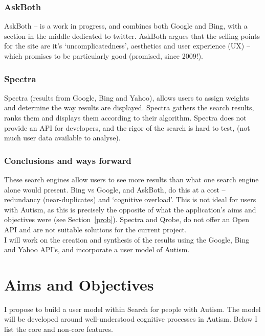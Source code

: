 \documentclass[a4paper, 10pt]{article}
\begin{document}
\subsubsection{AskBoth}
AskBoth – is a work in progress, and combines both Google and Bing, with a section in the middle dedicated to twitter. AskBoth argues that the selling points for the site are it’s ‘uncomplicatedness’, aesthetics and user experience (UX) – which promises to be particularly good (promised, since 2009!).

\subsubsection{Spectra}
Spectra (results from Google, Bing and Yahoo), allows users to assign weights and determine the way results are displayed. Spectra gathers the search results, ranks them and displays them according to their algorithm. Spectra does not provide an API for developers, and the rigor of the search is hard to test, (not much user data available to analyse).

\subsubsection{Conclusions and ways forward}
These search engines allow users to see more results than what one search engine alone would present. Bing vs Google, and AskBoth, do this at a cost -- redundancy (near-duplicates) and ‘cognitive overload’. This is not ideal for users with Autism, as this is precisely the opposite of what the application's aims and objectives were (see Section~\ref{prob}). Spectra and Qrobe, do not offer an Open API and are not suitable solutions for the current project. \\
I will work on the creation and synthesis of the results using the Google, Bing and Yahoo API's, and incorporate a user model of Autism.

\section{Aims and Objectives} 
I propose to build a user model within Search for people with Autism. The model will be developed around well-understood cognitive processes in Autism. Below I list the core and non-core features. 
\end{document}
